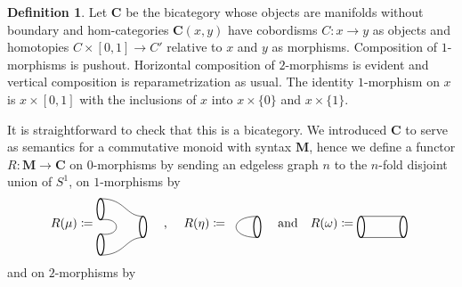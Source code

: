 \documentclass[11pt]{amsart}
\newcommand{\cat}[1]{\mathbf{#1}}
\renewcommand{\t}[1]{\textup{#1}}
\newcommand{\from}{\colon}
\theoremstyle{remark}
\theoremstyle{definition}
\newtheorem{defn}[thm]{Definition}
\begin{document}
\begin{defn}
	Let $\cat{C}$ be the bicategory whose objects are manifolds without boundary and hom-categories $\cat{C}(x,y)$ have cobordisms $C \from x \to y$ as objects and homotopies $C \times [0,1] \to C'$ relative to $x$ and $y$ as morphisms. Composition of $1$-morphisms is pushout.  Horizontal composition of $2$-morphisms is evident and vertical composition is reparametrization as usual. The identity $1$-morphism on $x$ is $x \times [0,1]$ with the inclusions of $x$ into $x \times \{ 0 \}$ and $x \times \{ 1 \}$.  
\end{defn}  

It is straightforward to check that this is a bicategory. We introduced $\cat{C}$ to serve as semantics for a commutative monoid with syntax $\cat{M}$, hence we define a functor $R \from \cat{M} \to \cat{C}$ on $0$-morphisms by sending an edgeless graph $n$ to the $n$-fold disjoint union of $S^1$, on $1$-morphisms by 
\[
R(\mu) \coloneqq
\raisebox{-0.5\height}{%
	\begin{tikzpicture}
		\draw [thick]  (1.6,-0.2) ellipse (0.1 and 0.3);
	\draw [thick]  (0.4,0.3) ellipse (0.1 and 0.3);
	\draw [thick] (0.4,-0.7) ellipse (0.1 and 0.3);
	\draw (0.4,0) .. controls (1,0.1) and (1,-0.5) .. (0.4,-0.4);
	\draw (0.4,0.6) .. controls (1.1,0.6) and (1.1,0.1) .. (1.6,0.1);
	\draw (0.4,-1) .. controls (1.1,-1) and (1.1,-0.5) .. (1.6,-0.5);
	\end{tikzpicture}
}
	\quad
	\t{, }
	\quad
R(\eta) \coloneqq
\raisebox{-0.5\height}{%
	\begin{tikzpicture}
	\draw [thick]  (0,0) ellipse (0.1 and 0.3);
	\draw (0,0.3) .. controls (-0.8,0.3) and (-0.8,-0.3) .. (0,-0.3);
	\end{tikzpicture}
}
%
%
%
\quad
\t{and}
\quad
%
%
%
R(\omega) \coloneqq
\raisebox{-0.5\height}{%
	\begin{tikzpicture}
	\draw [thick]  (1.6,-0.2) ellipse (0.1 and 0.3);
	\draw [thick] (0.4,-0.2) ellipse (0.1 and 0.3);
	\draw (0.4,0.1) -- (1.6,0.1);
	\draw (0.4,-0.5) -- (1.6,-0.5);
	\end{tikzpicture}
}
\]
and on $2$-morphisms by 
\end{document}
